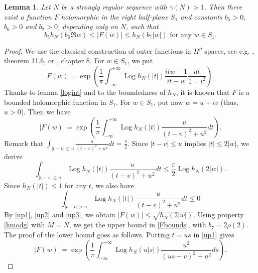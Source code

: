 \documentclass[a4paper]{amsart}
\theoremstyle{plain}
\newtheorem{lem}[subsubsection]{Lemma}
\theoremstyle{definition}
\theoremstyle{remark}
\DeclareMathOperator{\Log}{Log}
\begin{document}
\begin{lem}\label{key}
Let $ N $ be a strongly regular sequence with $ \gamma(N)>1 $. Then
there exist a function $ F $ holomorphic in the right half-plane $ S_1 $ and
constants $ b_5>0 $, $ b_6>0 $ and $ b_7>0 $, depending only on $ N $, such
that 
\begin{equation}\label{Fbounds}
b_5h_N(b_6\Re w)\leq\vert F(w)\vert \leq h_N(b_7\vert w\vert)\text{ for any }w\in S_1.
\end{equation}
\end{lem}
\begin{proof} We use the classical construction of outer functions in $ H^p $ spaces,
see e.g. \cite{Duren}, theorem 11.6, or \cite{Hof}, chapter 8. For $ w\in S_1 $, we put 
\begin{equation*}
F(w)=\exp\left(\frac{1}{\pi}\int_{-\infty}^{+\infty}\Log h_N(\vert t\vert)
\frac{itw-1}{it-w}\frac{dt}{1+t^2}\right).
\end{equation*}
Thanks to lemma \ref{logint} and to the boundedness of $ h_N $, it is known that
$ F $ is a bounded holomorphic function in $ S_1 $. 
For $ w\in S_1 $, put now $ w=u+iv $ (thus, $ u>0 $). Then we have
\begin{equation}\label{up1}
\vert F(w)\vert =\exp\left(\frac{1}{\pi}\int_{-\infty}^{+\infty}\Log h_N(\vert t\vert)
\frac{u}{(t-v)^2+u^2}dt\right).
\end{equation}
Remark that $ \int_{\vert t-v\vert\leq u}\frac{u}{(t-v)^2+u^2}dt=\frac{\pi}{2} $. Since $ \vert t-v\vert\leq u $ implies $ \vert t\vert\leq 2\vert w\vert $, we derive
\begin{equation}\label{up2}
\int_{\vert t-v\vert\leq u}\Log h_N(\vert t\vert)\frac{u}{(t-v)^2+u^2}dt \leq
\frac{\pi}{2}\Log h_N(2\vert w\vert).  
\end{equation}
Since $ h_N(\vert t\vert)\leq 1 $ for any $ t $, we also have
\begin{equation}\label{up3}
\int_{\vert t-v\vert> u}\Log h_N(\vert t\vert)\frac{u}{(t-v)^2+u^2}dt\leq 0
\end{equation}
By \eqref{up1}, \eqref{up2} and
\eqref{up3}, we obtain $ \vert F(w)\vert\leq \sqrt{h_N(2\vert w\vert)} $. 
Using property \eqref{hmodg} with $ M=N $, we get
the upper bound in \eqref{Fbounds}, with $ b_7=2\rho(2) $. The proof of the
lower bound goes as follows. Putting $ t=us $ in \eqref{up1} gives
\begin{equation}\label{low1}
\vert F(w)\vert =\exp\left(\frac{1}{\pi}\int_{-\infty}^{+\infty}\Log h_N(u\vert s\vert)
\frac{u^2}{(us-v)^2+u^2}ds\right).

\end{equation}
\end{proof}
\end{document}
